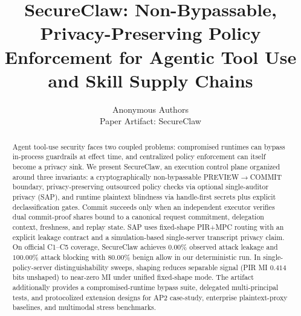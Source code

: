 \documentclass{article}
\title{SecureClaw: Non-Bypassable, Privacy-Preserving Policy Enforcement for Agentic Tool Use and Skill Supply Chains}
\author{%
  Anonymous Authors \\
  Paper Artifact: SecureClaw \\
}
\begin{document}
\maketitle


\begin{abstract}
Agent tool-use security faces two coupled problems: compromised runtimes can bypass in-process guardrails at effect time, and centralized policy enforcement can itself become a privacy sink.
We present SecureClaw, an execution control plane organized around three invariants: a cryptographically non-bypassable PREVIEW$\rightarrow$COMMIT boundary, privacy-preserving outsourced policy checks via optional single-auditor privacy (SAP), and runtime plaintext blindness via handle-first secrets plus explicit declassification gates.
Commit succeeds only when an independent executor verifies dual commit-proof shares bound to a canonical request commitment, delegation context, freshness, and replay state.
SAP uses fixed-shape PIR+MPC routing with an explicit leakage contract and a simulation-based single-server transcript privacy claim.
On official C1--C5 coverage, SecureClaw achieves $0.00\%$ observed attack leakage and $100.00\%$ attack blocking with $80.00\%$ benign allow in our deterministic run.
In single-policy-server distinguishability sweeps, shaping reduces separable signal (PIR MI $0.414$ bits unshaped) to near-zero MI under unified fixed-shape mode.
The artifact additionally provides a compromised-runtime bypass suite, delegated multi-principal tests, and protocolized extension designs for AP2 case-study, enterprise plaintext-proxy baselines, and multimodal stress benchmarks.
\end{abstract}






\appendix


\end{document}

